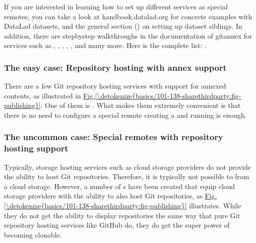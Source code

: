 \sphinxAtStartPar
If you are interested in learning how to set up different services as special remotes, you can take a look at handbook.datalad.org for concrete examples with DataLad datasets, and the general section {\hyperref[\detokenize{basics/101-139-hostingservices:share-hostingservice}]{}} () on setting up dataset siblings.
In addition, there are step\sphinxhyphen{}by\sphinxhyphen{}step walk\sphinxhyphen{}throughs in the documentation of git\sphinxhyphen{}annex for services such as , ,
,
,
, and many more.
Here is the complete list: .


\subsubsection{The easy case: Repository hosting with annex support}
\label{\detokenize{basics/101-138-sharethirdparty:the-easy-case-repository-hosting-with-annex-support}}
\sphinxAtStartPar
There are a few Git repository hosting services with support for annexed contents, as illustrated in \hyperref[\detokenize{basics/101-138-sharethirdparty:fig-specialpublishing}]{Fig.\@ \ref{\detokenize{basics/101-138-sharethirdparty:fig-publishing}}}.
One of them is {\hyperref[\detokenize{glossary:term-GIN}]{}}.
What makes them extremely convenient is that there is no need to configure a special remote \textendash{} creating a {\hyperref[\detokenize{glossary:term-sibling}]{}} and running  is enough.


\subsubsection{The uncommon case: Special remotes with repository hosting support}
\label{\detokenize{basics/101-138-sharethirdparty:the-uncommon-case-special-remotes-with-repository-hosting-support}}
\sphinxAtStartPar
Typically, storage hosting services such as cloud storage providers do not provide
the ability to host Git repositories.
Therefore, it is typically not possible to  from a cloud storage.
However, a number of {\hyperref[\detokenize{glossary:term-DataLad-extension}]{}}s have been created that equip cloud storage providers with the ability to also host Git repositories, as \hyperref[\detokenize{basics/101-138-sharethirdparty:fig-specialpublishing}]{Fig.\@ \ref{\detokenize{basics/101-138-sharethirdparty:fig-publishing}}} illustrates.
While they do not get the ability to display repositories the same way that pure
Git repository hosting services like GitHub do, they do get the super power of becoming clonable.

